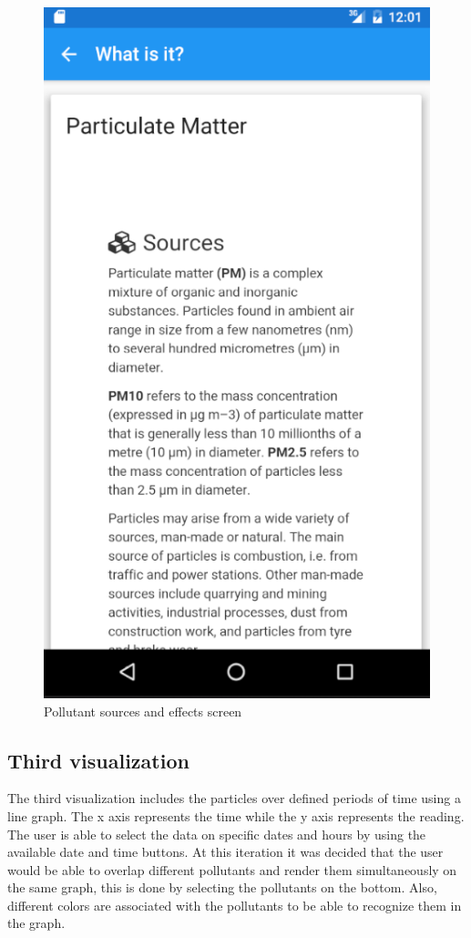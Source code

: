 \begin{figure}[H]
\begin{adjustbox}{width=.3\textwidth,center=\textwidth}
  \centering
  \includegraphics[scale=1]{images/second_visualization_sub_screen.png}
\end{adjustbox}
  \caption[Pollutant sources and effects screen]{Pollutant sources and effects screen}
  \label{fig:second_visualization_sub_screen}
\end{figure}

\subsection{Third visualization}
The third visualization includes the particles over defined periods of time using a line graph. The x axis represents the time while the y axis represents the reading. The user is able to select the data on specific dates and hours by using the available date and time buttons. At this iteration it was decided that the user would be able to overlap different pollutants and render them simultaneously on the same graph, this is done by selecting the pollutants on the bottom. Also, different colors are associated with the pollutants to be able to recognize them in the graph.

